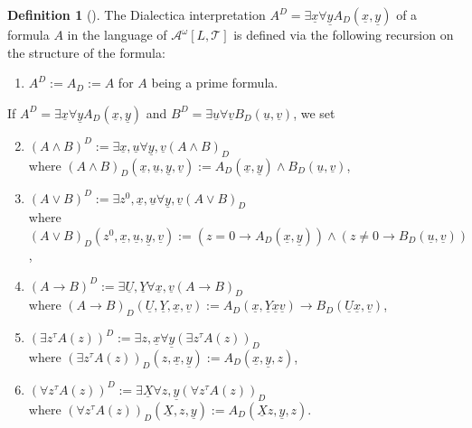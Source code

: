 \documentclass[11pt]{amsart}
\theoremstyle{definition}
\newtheorem{definition}[theorem]{Definition}
\theoremstyle{remark}
\begin{document}
\begin{definition}[\cite{Goe1958,Tro1973}]
The Dialectica interpretation $A^D=\exists\underline{x}\forall\underline{y} A_D(\underline{x},\underline{y})$ of a formula $A$ in the language of $\mathcal{A}^\omega[L,\mathcal{T}]$  is defined via the following recursion on the structure of the formula:
\begin{enumerate}
\item $A^D:=A_D:=A$ for $A$ being a prime formula.
\end{enumerate}
If $A^D=\exists\underline{x}\forall\underline{y} A_D(\underline{x},\underline{y})$ and $B^D=\exists\underline{u}\forall\underline{v} B_D(\underline{u},\underline{v})$, we set
\begin{enumerate}
\setcounter{enumi}{1}
\item $(A\land B)^D:=\exists\underline{x},\underline{u}\forall\underline{y},\underline{v}(A\land B)_D$\\ where $(A\land B)_D(\underline{x},\underline{u},\underline{y},\underline{v}):=A_D(\underline{x},\underline{y})\land B_D(\underline{u},\underline{v})$,
\item $(A\lor B)^D:=\exists z^0,\underline{x},\underline{u}\forall\underline{y},\underline{v}(A\lor B)_D$\\ where $(A\lor B)_D(z^0,\underline{x},\underline{u},\underline{y},\underline{v}):=(z=0\rightarrow A_D(\underline{x},\underline{y}))\land (z\neq 0\rightarrow B_D(\underline{u},\underline{v}))$,
\item $(A\rightarrow B)^D:=\exists\underline{U},\underline{Y}\forall\underline{x},\underline{v}(A\rightarrow B)_D$\\ where $(A\rightarrow B)_D(\underline{U},\underline{Y},\underline{x},\underline{v}):=A_D(\underline{x},\underline{Y}\underline{x}\underline{v})\to B_D(\underline{U}\underline{x},\underline{v})$,
\item $(\exists z^\tau A(z))^D:=\exists z,\underline{x}\forall\underline{y}(\exists z^\tau A(z))_D$\\ where $(\exists z^\tau A(z))_D(z,\underline{x},\underline{y}):=A_D(\underline{x},\underline{y},z)$,
\item $(\forall z^\tau A(z))^D:=\exists\underline{X}\forall z,\underline{y}(\forall z^\tau A(z))_D$\\ where $(\forall z^\tau A(z))_D(\underline{X},z,\underline{y}):=A_D(\underline{X}z,\underline{y},z)$.
\end{enumerate}
\end{definition}
\end{document}
